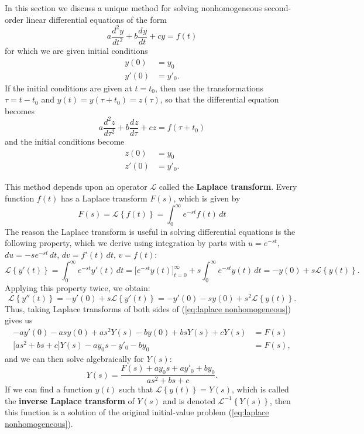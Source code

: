 \documentclass{myart}
\newcommand{\term}[1]{\textbf{#1}}
\newcommand{\eq}[1]{(\ref{eq:#1})}
\newcommand{\deriv}[3][]{\frac{d^{#1}#2}{d#3^{#1}}}
\renewcommand{\L}[1]{\mathcal{L}\left\{#1\right\}}
\newcommand{\Li}[1]{\mathcal{L}^{-1}\left\{#1\right\}}
\begin{document}
In this section we discuss a unique method for solving nonhomogeneous second-order linear differential equations of the form
\begin{equation} \label{eq:laplace nonhomogeneous}
a \deriv[2]{y}{t} + b \deriv{y}{t} + c y = f(t)
\end{equation}
for which we are given initial conditions
\begin{align*}
y(0) &= y_0 \\
y'(0) &= y'_0.
\end{align*}
If the initial conditions are given at $t = t_0$, then use the transformations $\tau = t - t_0$ and $y(t) = y(\tau + t_0) = z(\tau)$, so that the differential equation becomes
\begin{equation*}
a \deriv[2]{z}{\tau} + b \deriv{z}{\tau} + c z = f(\tau + t_0)
\end{equation*}
and the initial conditions become
\begin{align*}
z(0) &= y_0 \\
z'(0) &= y'_0.
\end{align*}

This method depends upon an operator $\mathcal{L}$ called the \term{Laplace transform}. Every function $f(t)$ has a Laplace transform $F(s)$, which is given by
\begin{equation*}
F(s) = \L{f(t)} = \int_0^\infty e^{-st} f(t) \,dt
\end{equation*}
The reason the Laplace transform is useful in solving differential equations is the following property, which we derive using integration by parts with $u = e^{-st}$, $du = -s e^{-st} \,dt$, $dv = f'(t) \,dt$, $v = f(t)$:
\begin{equation*}
\L{y'(t)} = \int_0^\infty e^{-st} y'(t) \,dt = \bigg[e^{-st} y(t)\bigg]_{t=0}^\infty + s \int_0^\infty e^{-st} y(t) \,dt = -y(0) + s \L{y(t)}.
\end{equation*}
Applying this property twice, we obtain:
\begin{equation*}
\L{y''(t)} = -y'(0) + s \L{y'(t)} = -y'(0) - s y(0) + s^2 \L{y(t)}.
\end{equation*}
Thus, taking Laplace transforms of both sides of \eq{laplace nonhomogeneous} gives us
\begin{align*}
-a y'(0) - as y(0) + as^2 Y(s) - b y(0) + bs Y(s) + c Y(s) &= F(s) \\
\big[as^2 + bs + c\big] Y(s) - a y_0 s - y'_0 - b y_0 &= F(s),
\end{align*}
and we can then solve algebraically for $Y(s)$:
\begin{equation*}
Y(s) = \frac{F(s) + ay_0s + ay'_0 + by_0}{as^2 + bs + c}.
\end{equation*}
If we can find a function $y(t)$ such that $\L{y(t)} = Y(s)$, which is called the \term{inverse Laplace transform} of $Y(s)$ and is denoted $\Li{Y(s)}$, then this function is a solution of the original initial-value problem \eq{laplace nonhomogeneous}.
\end{document}

